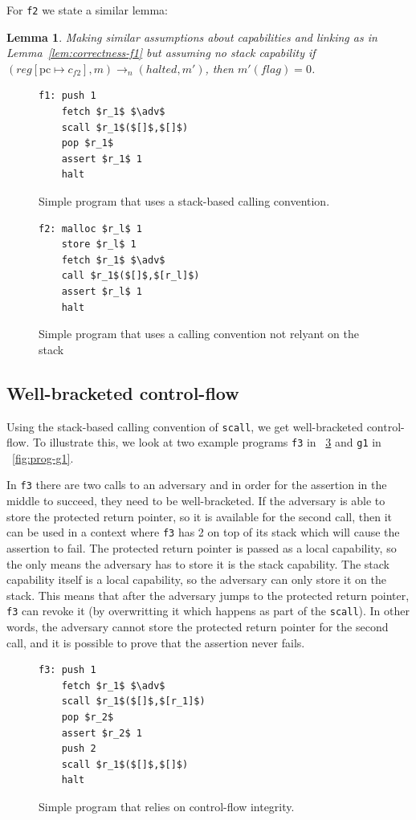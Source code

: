 \documentclass[compsoc,conference,letterpaper,fleqn]{IEEEtran}
\newtheorem{lemma}{Lemma}
\newcommand{\update}[2]{[#1 \mapsto #2]}
\newcommand{\var}[1]{\mathit{#1}}
\newcommand{\pcreg}{\mathrm{pc}}
\newcommand{\reg}{\var{reg}}
\newcommand{\adv}{\var{adv}}
\newcommand{\flag}{\var{flag}}
\newcommand{\halted}{\mathit{halted}}
\newcommand{\step}[1][]{\rightarrow_{#1}}
\begin{document}
For \texttt{f2} we state a similar lemma:
\begin{lemma}
  \label{lem:correctness-f2}
  Making similar assumptions about capabilities and linking as in
  Lemma~\ref{lem:correctness-f1} but assuming no stack capability
  if $(\reg\update{\pcreg}{c_{f2}},m) \step[n] (\halted,m')$, then $m'(\flag) = 0$.
\end{lemma}

\begin{figure}[htbp]
  \centering
  \begin{lstlisting}
f1: push 1
    fetch $r_1$ $\adv$
    scall $r_1$($[]$,$[]$)
    pop $r_1$
    assert $r_1$ 1
    halt
\end{lstlisting}
  \caption{Simple program that uses a stack-based calling convention.}
  \label{fig:prog-f1}
\end{figure}

\begin{figure}[htbp]
  \centering
\begin{lstlisting}
f2: malloc $r_l$ 1
    store $r_l$ 1
    fetch $r_1$ $\adv$
    call $r_1$($[]$,$[r_l]$)
    assert $r_l$ 1
    halt
\end{lstlisting}
  \caption{Simple program that uses a calling convention not relyant
    on the stack}
  \label{fig:prog-f2}
\end{figure}

\subsection{Well-bracketed control-flow} 
Using the stack-based calling convention of \texttt{scall}, we get
well-bracketed control-flow. To illustrate this, we look at
two example programs \texttt{f3} in \figurename~\ref{fig:prog-f3} and
\texttt{g1} in \figurename~\ref{fig:prog-g1}.

In \texttt{f3} there are two calls to an adversary and in order for
the assertion in the middle to succeed, they need to be
well-bracketed. If the adversary is able to store the protected return
pointer, so it is available for the second call, then it can be used
in a context where \texttt{f3} has 2 on top of its stack which will cause the
assertion to fail. The protected return pointer is passed as a local
capability, so the only means the adversary has to store it is the
stack capability. The stack capability itself is a local capability,
so the adversary can only store it on the stack. This means that after
the adversary jumps to the protected return pointer, \texttt{f3} can
revoke it (by overwritting it which happens as part of the
\texttt{scall}). In other words, the adversary cannot store the
protected return pointer for the second call, and it is possible to
prove that the assertion never fails.
\begin{figure}[htbp]
  \centering
  \begin{lstlisting}
f3: push 1
    fetch $r_1$ $\adv$
    scall $r_1$($[]$,$[r_1]$)
    pop $r_2$
    assert $r_2$ 1
    push 2
    scall $r_1$($[]$,$[]$)
    halt
\end{lstlisting}
  \caption{Simple program that relies on control-flow integrity.}
  \label{fig:prog-f3}
\end{figure}
\end{document}
